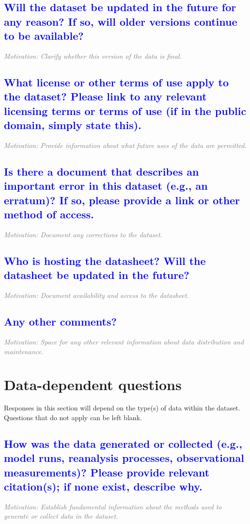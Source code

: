 \documentclass[letterpaper, 10 pt, transmag]{IEEEtran}
\begin{document}
\textcolor{blue}{\subsection{Will the dataset be updated in the future for any reason? If so, will older versions continue to be available?}}
\textcolor{gray}{\textit{Motivation: Clarify whether this version of the data is final.}}

\textcolor{blue}{\subsection{What license or other terms of use apply to the dataset? Please link to any relevant licensing terms or terms of use (if in the public domain, simply state this).}}
\textcolor{gray}{\textit{Motivation: Provide information about what future uses of the data are permitted.}}

\textcolor{blue}{\subsection{Is there a document that describes an important error in this dataset (e.g., an erratum)? If so, please provide a link or other method of access.}}
\textcolor{gray}{\textit{Motivation: Document any corrections to the dataset.}}

\textcolor{blue}{\subsection{Who is hosting the datasheet? Will the datasheet be updated in the future?}}
\textcolor{gray}{\textit{Motivation: Document availability and access to the datasheet.}}

\textcolor{blue}{\subsection{Any other comments?}}
\textcolor{gray}{\textit{Motivation: Space for any other relevant information about data distribution and maintenance.}}
\vspace{10mm}

\section{Data-dependent questions}
Responses in this section will depend on the type(s) of data within the dataset. Questions that do not apply can be left blank.


\textcolor{blue}{\subsection{How was the data generated or collected (e.g., model runs, reanalysis processes, observational measurements)? Please provide relevant citation(s); if none exist, describe why.}}
\textcolor{gray}{\textit{Motivation: Establish fundamental information about the methods used to generate or collect data in the dataset.}}
\end{document}
